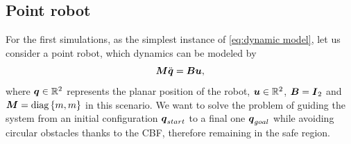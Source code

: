 
\subsection{Point robot}
For the first simulations, as the simplest instance of \eqref{eq:dynamic model}, let us consider a point robot, which dynamics can be modeled by
\begin{equation}\label{eq:pr dyn}
    \boldsymbol{M}\ddot{{\boldsymbol{q}}} = \boldsymbol{B}\boldsymbol{u},
\end{equation}
where ${\boldsymbol{q}} \in \mathbb{R}^2$ represents the planar position of the robot, $\boldsymbol{u} \in \mathbb{R}^2$, $\boldsymbol{B}=\boldsymbol{I}_{2}$ and $\boldsymbol{M} = \mbox{diag}\left\{m, m\right\}$ in this scenario.
We want to solve the problem of guiding the system from an initial configuration ${\boldsymbol{q}}_{start}$ to a final one ${\boldsymbol{q}}_{goal}$ while avoiding circular obstacles thanks to the CBF, therefore remaining in the safe region.
